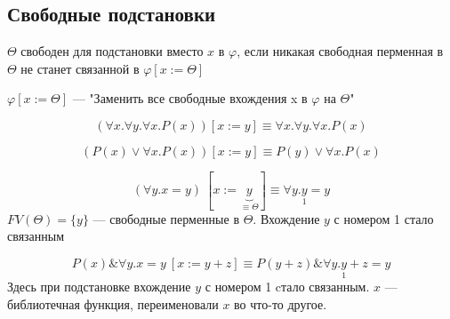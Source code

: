 \documentclass[english]{article}
\begin{document}
\subsection{Свободные подстановки}
\label{sec:org82c329d}
\begin{definition}
	\(\Theta\) свободен для подстановки вместо \(x\) в \(\varphi\), если никакая свободная перменная в \(\Theta\) не станет связанной в \(\varphi[x := \Theta]\)
\end{definition}
\begin{definition}
	\(\varphi[x := \Theta]\) --- "Заменить все свободные вхождения x в \(\varphi\) на \(\Theta\)"
\end{definition}
\begin{examp}
	\[ (\forall x. \forall y. \forall x. P(x))[x := y] \equiv \forall x. \forall y. \forall x. P(x) \]
\end{examp}
\begin{examp}
	\[ (P(x) \vee \forall x. P(x))[x := y] \equiv P(y) \vee \forall x. P(x) \]
\end{examp}
\begin{examp}
	\[ (\forall y. x = y)\ [x := \underbrace{y}_{\equiv \Theta}] \equiv \forall y. \underset{1}{y} = y\]
	\(FV(\Theta) = \{y\}\) --- свободные перменные в \(\Theta\). Вхождение \(y\) с номером 1 стало связанным
\end{examp}
\begin{examp}
	\[ P(x) \& \forall y. x = y\ [x := y + z] \equiv P(y + z) \& \forall y. \underset{1}{y} + z = y \]
	Здесь при подстановке вхождение \(y\) с номером 1 cтало связанным. \(x\) --- библиотечная функция, переименовали \(x\) во что-то другое.
\end{examp}
\end{document}
